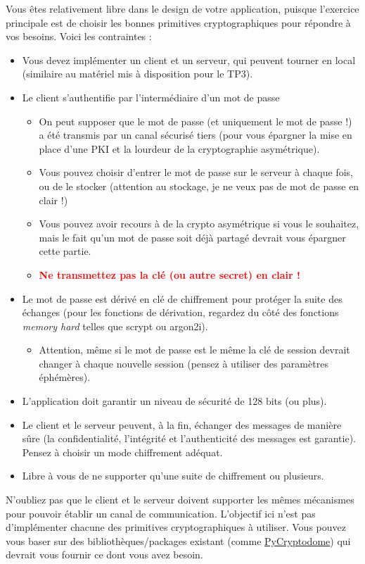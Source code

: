 \documentclass[french,a4paper,11pt]{exam}
\begin{document}
    Vous êtes relativement libre dans le design de votre application, puisque l'exercice principale est de choisir les bonnes primitives cryptographiques pour répondre à vos besoins.
    Voici les contraintes :
    \begin{itemize}
        \item Vous devez implémenter un client et un serveur, qui peuvent tourner en local (similaire au matériel mis à disposition pour le TP3).
        \item Le client s'authentifie par l'intermédiaire d'un mot de passe
        \begin{itemize}
            \item On peut supposer que le mot de passe (et uniquement le mot de passe !) a été transmis par un canal sécurisé tiers (pour vous épargner la mise en place d'une PKI et la lourdeur de la cryptographie asymétrique).
            \item Vous pouvez choisir d'entrer le mot de passe sur le serveur à chaque fois, ou de le stocker (attention au stockage, je ne veux pas de mot de passe en clair !)
            \item Vous pouvez avoir recours à de la crypto asymétrique si vous le souhaitez, mais le fait qu'un mot de passe soit déjà partagé devrait vous épargner cette partie.
            \item \textcolor{red}{\textbf{Ne transmettez pas la clé (ou autre secret) en clair !}}
        \end{itemize}
        \item Le mot de passe est dérivé en clé de chiffrement pour protéger la suite des échanges (pour les fonctions de dérivation, regardez du côté des  fonctions \textit{memory hard} telles que scrypt ou argon2i).
        \begin{itemize}
            \item Attention, même si le mot de passe est le même la clé de session devrait changer à chaque nouvelle session (pensez à utiliser des paramètres éphémères).
        \end{itemize}
        \item L'application doit garantir un niveau de sécurité de 128 bits (ou plus).
        \item Le client et le serveur peuvent, à la fin, échanger des messages de manière sûre (la confidentialité, l'intégrité et l'authenticité des messages est garantie). Pensez à choisir un mode chiffrement adéquat.
        \item Libre à vous de ne supporter qu'une suite de chiffrement ou plusieurs.
    \end{itemize}
    \vspace*{0.5cm}
    N'oubliez pas que le client et le serveur doivent supporter les mêmes mécanismes pour pouvoir établir un canal de communication. L'objectif ici n'est pas d'implémenter chacune des primitives cryptographiques à utiliser. Vous pouvez vous baser sur des bibliothèques/packages existant (comme \href{https://pypi.org/project/pycryptodome}{PyCryptodome}) qui devrait vous fournir ce dont vous avez besoin.
\end{document}
